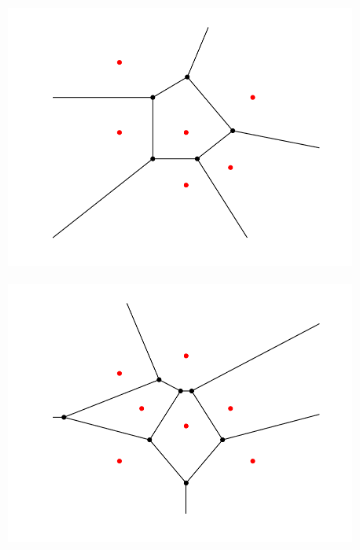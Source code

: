 \begin{figure}[ht]
    \centering
    \begin{subfigure}[b]{0.3\textwidth}
        \centering
        \includegraphics[width=\textwidth]{report/Images/Theory/voronoi/voronoi_example2.png}
    \end{subfigure}
    \begin{subfigure}[b]{0.3\textwidth}
        \centering
        \includegraphics[width=\textwidth]{report/Images/Theory/voronoi/voronoi_example1.png}
    \end{subfigure}
    \begin{subfigure}[b]{0.3\textwidth}
        \centering

\end{subfigure}
\end{figure}
